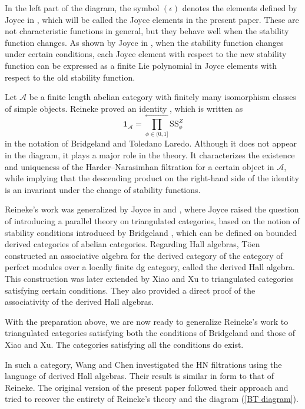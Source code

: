 \documentclass[a4paper,12pt]{amsart}
\numberwithin{equation}{section}
\newcommand{\Ss}{\mathrm{SS}}
\newcommand{\1}{\mathbf{1}}
\begin{document}
In the left part of the diagram, the symbol $(\epsilon)$ denotes the elements defined by Joyce in \cite{Joy2007}, which will be called the Joyce elements in the present paper. These are not characteristic functions in general, but they behave well when the stability function changes. As shown by Joyce in \cite{Joy2008}, when the stability function changes under certain conditions, each Joyce element with respect to the new stability function can be expressed as a finite Lie polynomial in Joyce elements with respect to the old stability function. 

Let $\mathcal{A}$ be a finite length abelian category with finitely many isomorphism classes of simple objects. Reineke proved an identity \cite[Proposition 4.12]{Rei2003}, which is written as
\begin{equation}\label{Reineke wall-crossing}
    \1_\mathcal{A}=\prod^\leftarrow_{\phi\in(0,1]}\Ss^Z_\phi
\end{equation}
in the notation of Bridgeland and Toledano Laredo. Although it does not appear in the diagram, it plays a major role in the theory. It characterizes the existence and uniqueness of the Harder–Narasimhan filtration for a certain object in $\mathcal{A}$, while implying that the descending product on the right-hand side of the identity is an invariant under the change of stability functions.
    
Reineke's work was generalized by Joyce in \cite{Joy2007} and \cite{Joy2008}, where Joyce raised the question \cite[Problem 7.1]{Joy2008} of introducing a parallel theory on triangulated categories, based on the notion of stability conditions introduced by Bridgeland \cite{Bri2007}, which can be defined on bounded derived categories of abelian categories. Regarding Hall algebras, T\"{o}en \cite{Toe2006} constructed an associative algebra for the derived category of the category of perfect modules over a locally finite dg category, called the derived Hall algebra. This construction was later extended by Xiao and Xu \cite{XX2008} to triangulated categories satisfying certain conditions. They also provided a direct proof of the associativity of the derived Hall algebras.

With the preparation above, we are now ready to generalize Reineke's work to triangulated categories satisfying both the conditions of Bridgeland and those of Xiao and Xu. The categories satisfying all the conditions do exist. 

In such a category, Wang and Chen \cite{WC2023} investigated the HN filtrations  using the language of derived Hall algebras. Their result is similar in form to that of Reineke. The original version of the present paper \cite{GX2025} followed their approach and tried to recover the entirety of Reineke's theory and the diagram (\ref{BT diagram}). 
\end{document}
